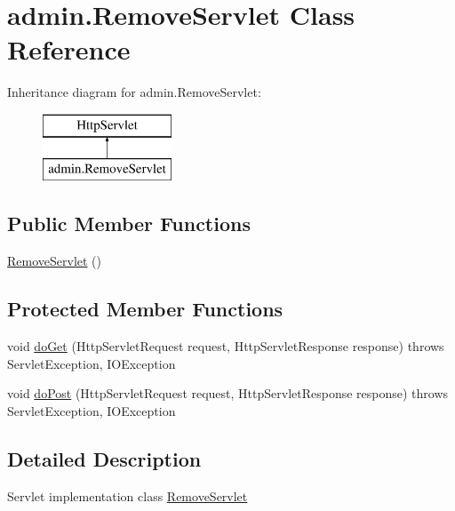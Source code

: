 \hypertarget{classadmin_1_1_remove_servlet}{}\section{admin.\+Remove\+Servlet Class Reference}
\label{classadmin_1_1_remove_servlet}
Inheritance diagram for admin.\+Remove\+Servlet\+:\begin{figure}[H]
\begin{center}
\leavevmode
\includegraphics[height=2.000000cm]{classadmin_1_1_remove_servlet}
\end{center}
\end{figure}
\subsection*{Public Member Functions}
\begin{DoxyCompactItemize}
\item 
\hyperlink{classadmin_1_1_remove_servlet_a4a37e587d1e6d20307aec984fbccb9e5}{Remove\+Servlet} ()
\end{DoxyCompactItemize}
\subsection*{Protected Member Functions}
\begin{DoxyCompactItemize}
\item 
void \hyperlink{classadmin_1_1_remove_servlet_abeaea85014c5e6cb6eded135ebb1cdec}{do\+Get} (Http\+Servlet\+Request request, Http\+Servlet\+Response response)  throws Servlet\+Exception, I\+O\+Exception 
\item 
void \hyperlink{classadmin_1_1_remove_servlet_a9d4e3b4e08640f72088a481aeb264c9a}{do\+Post} (Http\+Servlet\+Request request, Http\+Servlet\+Response response)  throws Servlet\+Exception, I\+O\+Exception 
\end{DoxyCompactItemize}


\subsection{Detailed Description}
Servlet implementation class \hyperlink{classadmin_1_1_remove_servlet}{Remove\+Servlet} 

